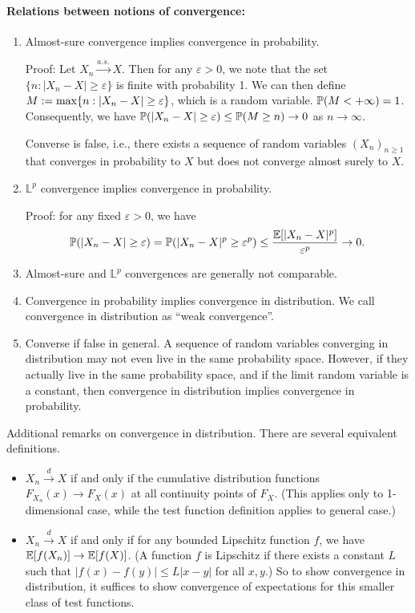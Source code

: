 \documentclass[11pt,letterpaper]{article}
\begin{document}
\paragraph{Relations between notions of convergence:}
\begin{enumerate}
  \item Almost-sure convergence implies convergence in probability.
  
  Proof: Let $X_n \xrightarrow{a.s.} X$. Then for any $\varepsilon > 0$, we note that the set $\{n: |X_n - X| \geq \varepsilon\}$ is finite with probability 1. We can then define $M := \max\{n: |X_n - X| \geq \varepsilon\}$, which is a random variable. ${\mathbb{P}} (M < + \infty) = 1$. Consequently, we have ${\mathbb{P}} (|X_n - X| \geq \varepsilon) \leq {\mathbb{P}} (M \geq n) \rightarrow 0$ as $n \rightarrow \infty$.

  Converse is false, i.e., there exists a sequence of random variables $(X_n)_{n \geq 1}$ that converges in probability to $X$ but does not converge almost surely to $X$.

  \item $\mathbb{L}^p$ convergence implies convergence in probability.
  
  Proof: for any fixed $\varepsilon > 0$, we have
  \begin{align*}
    {\mathbb{P}}(|X_n - X| \geq \varepsilon) = {\mathbb{P}}(|X_n - X|^p \geq \varepsilon^p) \leq \frac{{\mathbb{E}}[|X_n - X|^p]}{\varepsilon^p} \rightarrow 0.
  \end{align*}
  \item Almost-sure and $\mathbb{L}^p$ convergences are generally not comparable.
  \item Convergence in probability implies convergence in distribution. We call convergence in distribution as ``weak convergence''.
  \item Converse if false in general. A sequence of random variables converging in distribution may not even live in the same probability space. However, if they actually live in the same probability space, and if the limit random variable is a constant, then convergence in distribution implies convergence in probability.
\end{enumerate}

Additional remarks on convergence in distribution. There are several equivalent definitions.
\begin{itemize}
  \item $X_n \xrightarrow{d} X$ if and only if the cumulative distribution functions $F_{X_n}(x) \to F_X(x)$ at all continuity points of $F_X$. (This applies only to 1-dimensional case, while the test function definition applies to general case.)
  \item $X_n \xrightarrow{d} X$ if and only if for any bounded Lipschitz function $f$, we have ${\mathbb{E}}[f(X_n)] \to {\mathbb{E}}[f(X)]$. (A function $f$ is Lipschitz if there exists a constant $L$ such that $|f(x) - f(y)| \leq L |x - y|$ for all $x,y$.) So to show convergence in distribution, it suffices to show convergence of expectations for this smaller class of test functions.
\end{itemize}
\end{document}
